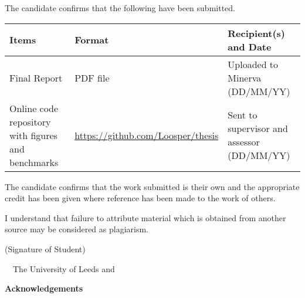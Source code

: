 \frontcover

\clearpage

\noindent The candidate confirms that the following have been submitted.\\


\begin{table}[ht!]
\begin{tabular}{|p{}|p{}|p{}|}
\hline
    Items & Format & Recipient(s) and Date \\
\hline
    Final Report & PDF file & Uploaded to Minerva (DD/MM/YY) \\
\hline
    Online code repository with figures and benchmarks &
    \url{https://github.com/Loosper/thesis} &
    Sent to supervisor and assessor (DD/MM/YY) \\
\hline
\end{tabular}
\end{table}


\vfill

\noindent The candidate confirms that the work submitted is their own and the appropriate credit has been given where reference has been made to the work of others.

\vfill

\noindent I understand that failure to attribute material which is obtained from another source may be considered as plagiarism.

\vfill

\flushright(Signature of Student) \fullname
\flushleft

\vfill

\textcopyright~\session~The University of Leeds and~\fullname

\begin{dissertationsummary}

\end{dissertationsummary}

\clearpage
\centering\textbf{Acknowledgements}
\flushleft


\tableofcontents


\clearpage
{}
\setlength{\parindent}{11pt}
